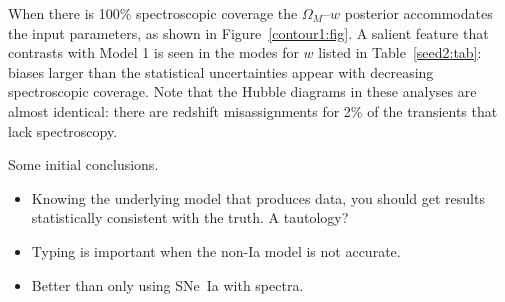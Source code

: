 \documentclass[preprint]{elsarticle}
\begin{document}
When there is 100\% spectroscopic coverage the   $\Omega_M$--$w$  posterior accommodates the input 
parameters, as shown  in
Figure~\ref{contour1:fig}.
A salient feature that contrasts with Model 1 is 
seen in the modes for $w$ listed in Table~\ref{seed2:tab}: biases
larger than the statistical uncertainties appear with decreasing
spectroscopic coverage.  Note that the Hubble diagrams
in these analyses are almost identical: there are redshift misassignments
for 2\% of the transients that lack spectroscopy. 


%


Some initial conclusions.
\begin{itemize}
\item Knowing the underlying model that produces data, you should
get results statistically consistent with the truth.  A tautology?
\item Typing is important when the non-Ia model is not accurate.
\item Better than only using SNe~Ia with spectra.
\end{itemize}
\end{document}
